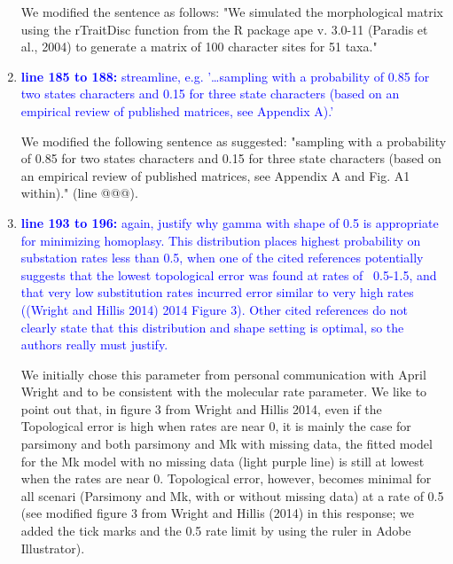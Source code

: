 \documentclass[12pt,letterpaper]{article}
\begin{document}
\begin{enumerate}
We modified the sentence as follows: "We simulated the morphological matrix using the rTraitDisc function from the R package ape v. 3.0-11 (Paradis et al., 2004) to generate a matrix of 100 character sites for 51 taxa."

\item{\textcolor{blue}{\textbf{line 185 to 188:} streamline, e.g. '…sampling with a probability of 0.85 for two states characters and 0.15 for three state characters (based on an empirical review of published matrices, see Appendix A).'}}

We modified the following sentence as suggested: "sampling with a probability of 0.85 for two states characters and 0.15 for three state characters (based on an empirical review of published matrices, see Appendix A and Fig. A1 within)." (line @@@).

\item{\textcolor{blue}{\textbf{line 193 to 196:} again, justify why gamma with shape of 0.5 is appropriate for minimizing homoplasy. This distribution places highest probability on substation rates less than 0.5, when one of the cited references potentially suggests that the lowest topological error was found at rates of ~0.5-1.5, and that very low substitution rates incurred error similar to very high rates ((Wright and Hillis 2014) 2014 Figure 3). Other cited references do not clearly state that this distribution and shape setting is optimal, so the authors really must justify. }}

We initially chose this parameter from personal communication with April Wright and to be consistent with the molecular rate parameter.
We like to point out that, in figure 3 from Wright and Hillis 2014, even if the Topological error is high when rates are near 0, it is mainly the case for parsimony and both parsimony and Mk with missing data, the fitted model for the Mk model with no missing data (light purple line) is still at lowest when the rates are near 0.
Topological error, however, becomes minimal for all scenari (Parsimony and Mk, with or without missing data) at a rate of 0.5 (see modified figure 3 from Wright and Hillis (2014) in this response; we added the tick marks and the 0.5 rate limit by using the ruler in Adobe Illustrator).


\end{enumerate}
\end{document}
